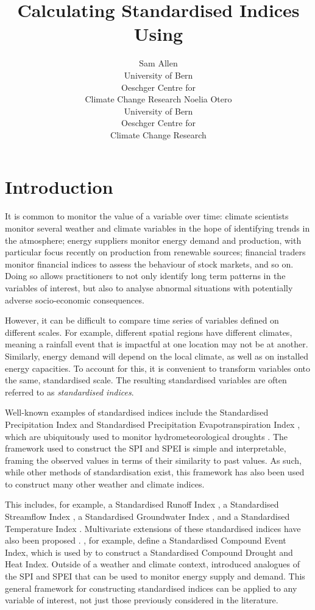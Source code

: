 \documentclass[article,shortnames,nojss]{jss}\usepackage[]{graphicx}\usepackage[]{xcolor}
\author{Sam Allen\\University of Bern\\Oeschger Centre for \\Climate Change Research
\And Noelia Otero\\University of Bern\\Oeschger Centre for \\Climate Change Research}
\title{Calculating Standardised Indices Using \pkg{SEI}}
\begin{document}
\section{Introduction}\label{section:intro}

It is common to monitor the value of a variable over time: climate scientists monitor several weather and climate variables in the hope of identifying trends in the atmosphere; energy suppliers monitor energy demand and production, with particular focus recently on production from renewable sources; financial traders monitor financial indices to assess the behaviour of stock markets, and so on. Doing so allows practitioners to not only identify long term patterns in the variables of interest, but also to analyse abnormal situations with potentially adverse socio-economic consequences.

However, it can be difficult to compare time series of variables defined on different scales. For example, different spatial regions have different climates, meaning a rainfall event that is impactful at one location may not be at another. Similarly, energy demand will depend on the local climate, as well as on installed energy capacities. To account for this, it is convenient to transform variables onto the same, standardised scale. The resulting standardised variables are often referred to as \emph{standardised indices}.

Well-known examples of standardised indices include the Standardised Precipitation Index \citep[SPI;][]{McKeeEtAl1993} and Standardised Precipitation Evapotranspiration Index \citep[SPEI;][]{VicenteEtAl2010}, which are ubiquitously used to monitor hydrometeorological droughts \citep{BegueriaEtAl2014}. The framework used to construct the SPI and SPEI is simple and interpretable, framing the observed values in terms of their similarity to past values. As such, while other methods of standardisation exist, this framework has also been used to construct many other weather and climate indices.

This includes, for example, a Standardised Runoff Index \citep{ShuklaWood2008}, a Standardised Streamflow Index \citep{VicenteEtAl2012}, a Standardised Groundwater Index \citep{BloomfieldMarchant2013}, and a Standardised Temperature Index \citep{ZscheischlerEtAl2014}. Multivariate extensions of these standardised indices have also been proposed \citep{ErhardtCzado2018}. \cite{HaoEtAl2019}, for example, define a Standardised Compound Event Index, which is used by \cite{LiEtAl2021} to construct a Standardised Compound Drought and Heat Index. Outside of a weather and climate context, \cite{AllenOtero2023} introduced analogues of the SPI and SPEI that can be used to monitor energy supply and demand. This general framework for constructing standardised indices can be applied to any variable of interest, not just those previously considered in the literature.
\end{document}
